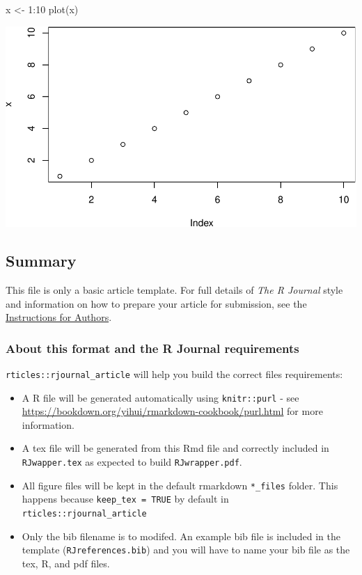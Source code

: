 \begin{Schunk}
\begin{Sinput}
x <- 1:10
plot(x)
\end{Sinput}

\includegraphics{rjournal-paper_files/figure-latex/unnamed-chunk-1-1} \end{Schunk}

\hypertarget{summary}{%
\subsection{Summary}\label{summary}}

This file is only a basic article template. For full details of
\emph{The R Journal} style and information on how to prepare your
article for submission, see the
\href{https://journal.r-project.org/share/author-guide.pdf}{Instructions
for Authors}.

\hypertarget{about-this-format-and-the-r-journal-requirements}{%
\subsubsection{About this format and the R Journal
requirements}\label{about-this-format-and-the-r-journal-requirements}}

\texttt{rticles::rjournal\_article} will help you build the correct
files requirements:

\begin{itemize}
\tightlist
\item
  A R file will be generated automatically using \texttt{knitr::purl} -
  see \url{https://bookdown.org/yihui/rmarkdown-cookbook/purl.html} for
  more information.
\item
  A tex file will be generated from this Rmd file and correctly included
  in \texttt{RJwapper.tex} as expected to build \texttt{RJwrapper.pdf}.
\item
  All figure files will be kept in the default rmarkdown
  \texttt{*\_files} folder. This happens because
  \texttt{keep\_tex\ =\ TRUE} by default in
  \texttt{rticles::rjournal\_article}
\item
  Only the bib filename is to modifed. An example bib file is included
  in the template (\texttt{RJreferences.bib}) and you will have to name
  your bib file as the tex, R, and pdf files.
\end{itemize}

